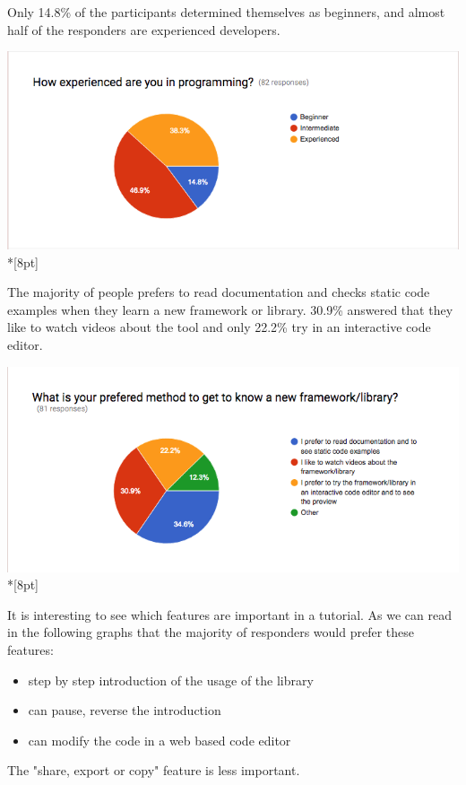 \documentclass[11pt, a4paper, oneside, openright, medskipamount]{report}
\begin{document}
Only 14.8\% of the participants determined themselves as beginners, and almost half of the responders are experienced developers.

\includegraphics[width=1\textwidth]{assets/survey-result/how-experienced.png}\\*[8pt]

The majority of people prefers to read documentation and checks static code examples when they learn a new framework or library. 30.9\% answered that they like to watch videos about the tool and only 22.2\% try in an interactive code editor.

\includegraphics[width=1\textwidth]{assets/survey-result/prefered-method.png}\\*[8pt]

It is interesting to see which features are important in a tutorial. As we can read in the following graphs that the majority of responders would prefer these features:
\begin{itemize}[noitemsep]
\item step by step introduction of the usage of the library
\item can pause, reverse the introduction
\item can modify the code in a web based code editor
\end{itemize}

The "share, export or copy" feature is less important.
\end{document}
